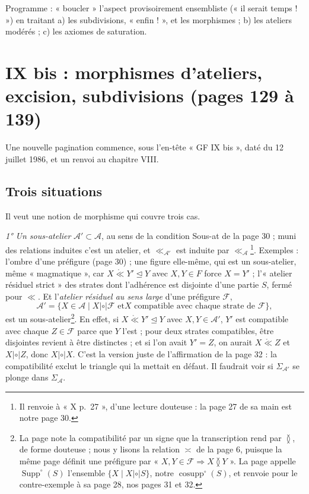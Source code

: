 \documentclass[11pt,a4paper]{article}
\begin{document}
Programme : « boucler » l'aspect provisoirement ensembliste (« il serait
temps ! ») en traitant a) les subdivisions, « enfin ! », et les morphismes ; b)
les ateliers modérés ; c) les axiomes de saturation.

\section*{IX bis : morphismes d'ateliers, excision, subdivisions (pages 129 à 139)}

Une nouvelle pagination commence, sous l'en-tête « GF IX bis », daté du 12 juillet 1986, et un renvoi au chapitre VIII.

\subsection*{Trois situations}

Il veut une notion de morphisme qui couvre trois cas.

\emph{1° Un sous-atelier} $\mathcal{A}' \subset \mathcal{A}$, au sens de la
condition Sous-at de la page 30 ; muni des relations induites c'est un atelier, et
$\ll_{\mathcal{A}'}$ est induite par $\ll_{\mathcal{A}}$\footnote{Il renvoie à
« X p.~27 », d'une lecture douteuse : la page 27 de sa main est notre page 30.}.
Exemples : l'ombre d'une préfigure (page 30) ; une figure elle-même, qui est un
sous-atelier, même « magmatique », car $X \mathrel{\mathring{\ll}} Y'
\trianglelefteq Y$ avec $X, Y \in F$ force $X = Y'$ ; l'« atelier résiduel
strict » des strates dont l'adhérence est disjointe d'une partie $S$, fermé pour
$\ll$. Et l'\emph{atelier résiduel au sens large} d'une préfigure $\mathcal{F}$,
\[
\mathcal{A}' = \{ X \in \mathcal{A} \mid X \mathrel{|\circ|} \mathcal{F} \text{ et
} X \text{ compatible avec chaque strate de } \mathcal{F} \},
\]
est un sous-atelier\footnote{La page note la compatibilité par un signe que la
transcription rend par $\between$, de forme douteuse ; nous y lisons la relation
$\asymp$ de la page 6, puisque la même page définit une préfigure par « $X, Y \in
\mathcal{F} \Rightarrow X \between Y$ ». La page appelle
$\operatorname{Supp}^{\circ}(S)$ l'ensemble $\{X \mid X \mathrel{|\circ|} S\}$,
notre $\operatorname{cosupp}^{\circ}(S)$, et renvoie pour le contre-exemple à sa
page 28, nos pages 31 et 32.}. En effet, si $X \mathrel{\mathring{\ll}} Y'
\trianglelefteq Y$ avec $X, Y \in \mathcal{A}'$, $Y'$ est compatible avec chaque
$Z \in \mathcal{F}$ parce que $Y$ l'est ; pour deux strates compatibles, être
disjointes revient à être distinctes ; et si l'on avait $Y' = Z$, on aurait $X
\mathrel{\mathring{\ll}} Z$ et $X \mathrel{|\circ|} Z$, donc $X \mathrel{|\circ|}
X$. C'est la version juste de l'affirmation de la page 32 : la compatibilité
exclut le triangle qui la mettait en défaut. Il faudrait voir si $\Sigma_{\mathcal{A}'}$
se plonge dans $\Sigma_{\mathcal{A}}$.
\end{document}
